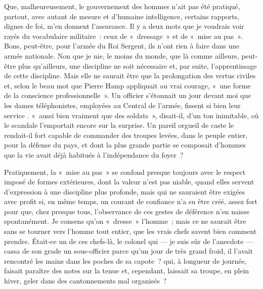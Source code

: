 \documentclass[french,twoside]{book} %
\begin{document}
Que, malheureusement, le gouvernement des hommes n’ait pas été pratiqué, partout, avec autant de mesure et d’humaine intelligence, certains rapports, dignes de foi, m’en donnent l’assurance. Il y a deux mots que je voudrais voir rayés du vocabulaire militaire : ceux de « dressage » et de « mise au pas ». Bons, peut-être, pour l’armée du Roi Sergent, ils n’ont rien à faire dans une armée nationale. Non que je nie, le moins du monde, que là comme ailleurs, peut-être plus qu’ailleurs, une discipline ne soit nécessaire et, par suite, l’apprentissage de cette discipline. Mais elle ne saurait être que la prolongation des vertus civiles et, selon le beau mot que Pierre Hamp appliquait au vrai courage, « une forme de la conscience professionnelle ». Un officier s’étonnait un jour devant moi que les dames téléphonistes, employées au Central de l’armée, fissent si bien leur service . « aussi bien vraiment que des soldats », disait-il, d’un ton inimitable, où le scandale l’emportait encore sur la surprise. Un pareil orgueil de caste le rendait-il fort capable de commander des troupes levées, dans le peuple entier, pour la défense du pays, et dont la plus grande partie se composait d’hommes que la vie avait déjà habitués à l’indépendance du foyer ?\par
Pratiquement, la « mise au pas » se confond   presque toujours avec le respect imposé de formes extérieures, dont la valeur n’est pas niable, quand elles servent d’expression à une discipline plus profonde, mais qui ne sauraient être exigées avec profit si, en même temps, un courant de confiance n’a su être créé, assez fort pour que, chez presque tous, l’observance de ces gestes de déférence n’en naisse spontanément. Je consens qu’on « dresse » l’homme ; mais ce ne saurait être sans se tourner vers l’homme tout entier, que les vrais chefs savent bien comment prendre. Était-ce un de ces chefs-là, le colonel qui — je suis sûr de l’anecdote — cassa de son grade un sous-officier parce qu’un jour de très grand froid, il l’avait rencontré les mains dans les poches de sa capote ? qui, à longueur de journée, faisait paraître des notes sur la tenue et, cependant, laissait sa troupe, en plein hiver, geler dans des cantonnements mal organisés ?\par
\end{document}
